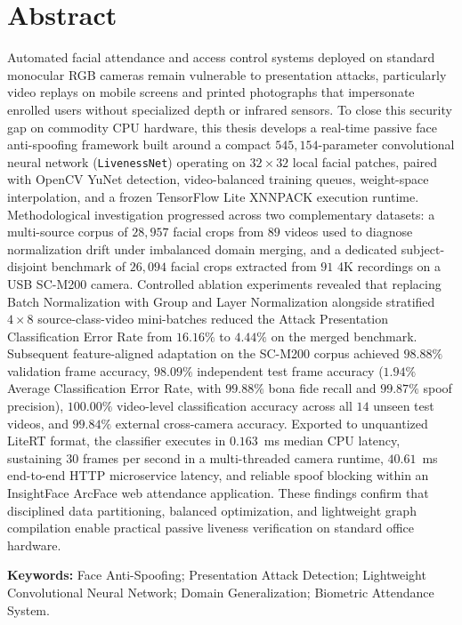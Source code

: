 \chapter*{Abstract}
\normalsize

Automated facial attendance and access control systems deployed on standard monocular RGB cameras remain vulnerable to presentation attacks, particularly video replays on mobile screens and printed photographs that impersonate enrolled users without specialized depth or infrared sensors. To close this security gap on commodity CPU hardware, this thesis develops a real-time passive face anti-spoofing framework built around a compact $545{,}154$-parameter convolutional neural network (\texttt{LivenessNet}) operating on $32 \times 32$ local facial patches, paired with OpenCV YuNet detection, video-balanced training queues, weight-space interpolation, and a frozen TensorFlow Lite XNNPACK execution runtime. Methodological investigation progressed across two complementary datasets: a multi-source corpus of $28{,}957$ facial crops from $89$ videos used to diagnose normalization drift under imbalanced domain merging, and a dedicated subject-disjoint benchmark of $26{,}094$ facial crops extracted from $91$ 4K recordings on a USB SC-M200 camera. Controlled ablation experiments revealed that replacing Batch Normalization with Group and Layer Normalization alongside stratified $4 \times 8$ source-class-video mini-batches reduced the Attack Presentation Classification Error Rate from $16.16\%$ to $4.44\%$ on the merged benchmark. Subsequent feature-aligned adaptation on the SC-M200 corpus achieved $98.88\%$ validation frame accuracy, $98.09\%$ independent test frame accuracy ($1.94\%$ Average Classification Error Rate, with $99.88\%$ bona fide recall and $99.87\%$ spoof precision), $100.00\%$ video-level classification accuracy across all $14$ unseen test videos, and $99.84\%$ external cross-camera accuracy. Exported to unquantized LiteRT format, the classifier executes in $0.163$~ms median CPU latency, sustaining $30$ frames per second in a multi-threaded camera runtime, $40.61$~ms end-to-end HTTP microservice latency, and reliable spoof blocking within an InsightFace ArcFace web attendance application. These findings confirm that disciplined data partitioning, balanced optimization, and lightweight graph compilation enable practical passive liveness verification on standard office hardware.

\vspace{0.5cm}
\noindent\textbf{Keywords:} Face Anti-Spoofing; Presentation Attack Detection; Lightweight Convolutional Neural Network; Domain Generalization; Biometric Attendance System.
